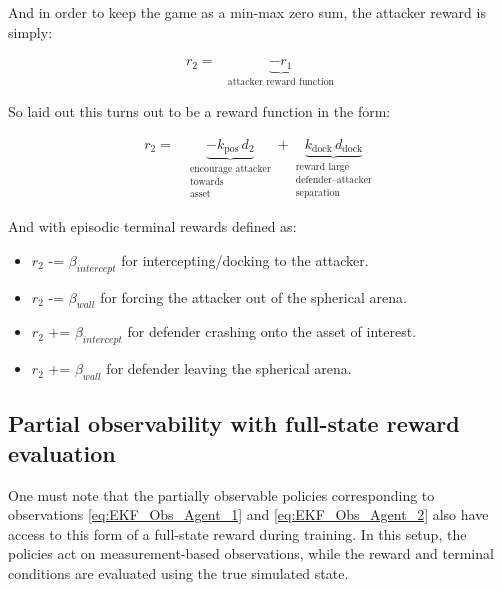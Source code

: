 And in order to keep the game as a min-max zero sum, the attacker reward is simply: 

\[
\boxed{
\begin{aligned}
r_2
= {}&
\underbrace{-r_1}_{\text{attacker reward function}}
\end{aligned}
}
\]

So laid out this turns out to be a reward function in the form:

\begin{equation}
\label{eq:attacker_step_reward}
\boxed{
\begin{aligned}
r_2
= {}&
\underbrace{-k_{\text{pos}}\, d_2}_{\substack{\text{encourage attacker}\\\text{towards}\\\text{asset}}}
+
\underbrace{k_{\text{dock}}\, d_{\text{dock}}}_{\substack{\text{reward large}\\\text{defender--attacker}\\\text{separation}}}
\end{aligned}
}
\end{equation}

And with episodic terminal rewards defined as:

\begin{itemize}
    \item $r_2$ -= $\beta_{intercept}$ for intercepting/docking to the attacker.
    \item $r_2$ -= $\beta_{wall}$ for forcing the attacker out of the spherical arena.
    \item $r_2$ += $\beta_{intercept}$ for defender crashing onto the asset of interest.
    \item $r_2$ += $\beta_{wall}$ for defender leaving the spherical arena.
    
\end{itemize}

\subsection{Partial observability with full-state reward evaluation}
\label{subsec:partial-observability-full-state-rewards}

One must note that the partially observable policies corresponding to observations \ref{eq:EKF_Obs_Agent_1} and \ref{eq:EKF_Obs_Agent_2} also have access to this form of a full-state reward during training. In this setup, the policies act on measurement-based observations, while the reward and terminal conditions are evaluated using the true simulated state.

